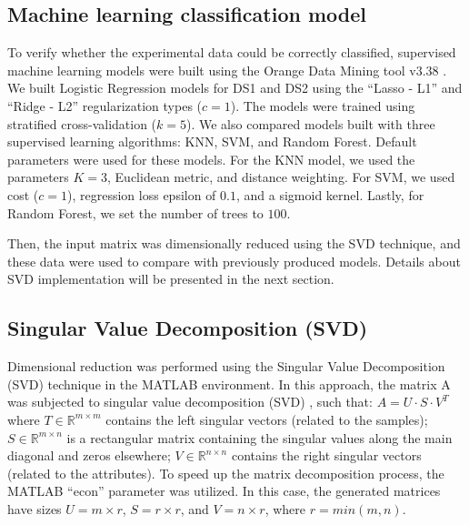 \subsection{Machine learning classification model}

To verify whether the experimental data could be correctly classified, supervised machine learning models were built using the Orange Data Mining tool v3.38 %
\cite{demsar_2013}. We built Logistic Regression models for DS1 and DS2 using the ``Lasso - L1'' and ``Ridge - L2'' regularization types ($c = 1$). The models were trained using stratified cross-validation ($k = 5$). We also compared models built with three supervised learning algorithms: KNN, SVM, and Random Forest. Default parameters were used for these models. For the KNN model, we used the parameters $K = 3$, Euclidean metric, and distance weighting. For SVM, we used cost ($c = 1$), regression loss epsilon of $0.1$, and a sigmoid kernel. Lastly, for Random Forest, we set the number of trees to $100$.

Then, the input matrix was dimensionally reduced using the SVD technique, and these data were used to compare with previously produced models. Details about SVD implementation will be presented in the next section.

\subsection{Singular Value Decomposition (SVD)}

Dimensional reduction was performed using the Singular Value Decomposition (SVD) technique in the MATLAB environment. In this approach, the matrix A was subjected to singular value decomposition (SVD) %
\cite{marcolino_genome_2010}, such that: $A = U \cdot S \cdot V^T$
where $T \in \mathbb{R}^{m \times m}$ contains the left singular vectors (related to the samples); $S \in \mathbb{R}^{m \times n}$ is a rectangular matrix containing the singular values along the main diagonal and zeros elsewhere; $V \in \mathbb{R}^{n \times n}$ contains the right singular vectors (related to the attributes). To speed up the matrix decomposition process, the MATLAB ``econ'' parameter was utilized. In this case, the generated matrices have sizes $U = m \times r$, $S = r \times r$, and $V = n \times r$, where $r = min(m, n)$.

